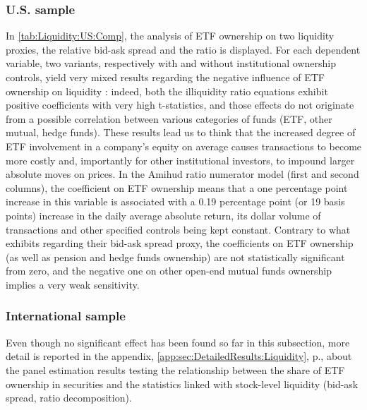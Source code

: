 \subsubsection{U.S. sample}
In \autoref{tab:Liquidity:US:Comp}, the analysis of ETF ownership on two liquidity proxies, the relative bid-ask spread and the \textcite{Amihud2002} ratio is displayed. For each dependent variable, two variants, respectively with and without institutional ownership controls, yield very mixed results regarding the negative influence of ETF ownership on liquidity : indeed, both the illiquidity ratio equations exhibit positive coefficients with very high t-statistics, and those effects do not originate from a possible correlation between various categories of funds (ETF, other mutual, hedge funds). These results lead us to think that the increased degree of ETF involvement in a company's equity on average causes transactions to become more costly and, importantly for other institutional investors, to impound larger absolute moves on prices. In the Amihud ratio numerator model (first and second columns), the coefficient on ETF ownership means that a one percentage point increase in this variable is associated with a 0.19 percentage point (or 19 basis points) increase in the daily average absolute return, its dollar volume of transactions and other specified controls being kept constant. Contrary to what \textcite{Israeli2017} exhibits regarding their bid-ask spread proxy, the coefficients on ETF ownership (as well as pension and hedge funds ownership) are not statistically significant from zero, and the negative one on other open-end mutual funds ownership implies a very weak sensitivity.

\begin{landscape}
  {\linespread{1.0}
    \begin{table}[htbp]
      
    \end{table}
  }
\end{landscape}

\subsubsection{International sample}

Even though no significant effect has been found so far in this subsection, more detail is reported in the appendix, \autoref{app:sec:DetailedResults:Liquidity}, p.\pageref{app:sec:DetailedResults:Liquidity},  about the panel estimation results testing the relationship between the share of ETF ownership in securities and the statistics linked with stock-level liquidity (bid-ask spread, \textcite{Amihud2002} ratio decomposition). 


